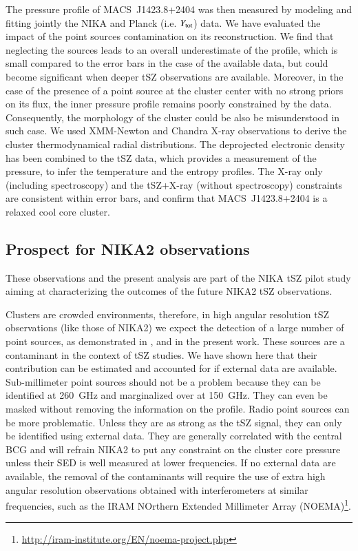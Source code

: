 \documentclass[twocolumn,traditabstract]{aa}
\begin{document}
The pressure profile of \mbox{MACS~J1423.8+2404} was then measured by modeling and fitting jointly the NIKA and Planck (i.e. $Y_{\rm tot}$) data. We have evaluated the impact of the point sources contamination on its reconstruction. We find that neglecting the sources leads to an overall underestimate of the profile, which is small compared to the error bars in the case of the available data, but could become significant when deeper tSZ observations are available. Moreover, in the case of the presence of a point source at the cluster center with no strong priors on its flux, the inner pressure profile remains poorly constrained by the data. Consequently, the morphology of the cluster could be also be misunderstood in such case. We used XMM-Newton and Chandra X-ray observations to derive the cluster thermodynamical radial distributions. The deprojected electronic density has been combined to the tSZ data, which provides a measurement of the pressure, to infer the temperature and the entropy profiles. The X-ray only (including spectroscopy) and the tSZ+X-ray (without spectroscopy) constraints are consistent within error bars, and confirm that \mbox{MACS~J1423.8+2404} is a relaxed cool core cluster.

\subsection{Prospect for NIKA2 observations}
These observations and the present analysis are part of the NIKA tSZ pilot study aiming at characterizing the outcomes of the future NIKA2 tSZ observations.

Clusters are crowded environments, therefore, in high angular resolution tSZ observations (like those of NIKA2) we expect the detection of a large number of point sources, as demonstrated in \cite{adam2013}, \cite{adam2014} and in the present work. These sources are a contaminant in the context of tSZ studies. We have shown here that their contribution can be estimated and accounted for if external data are available. Sub-millimeter point sources should not be a problem because they can be identified at 260~GHz and marginalized over at 150~GHz. They can even be masked without removing the information on the profile. Radio point sources can be more problematic. Unless they are as strong as the tSZ signal, they can only be identified using external data. They are generally correlated with the central BCG and will refrain NIKA2 to put any constraint on the cluster core pressure unless their SED is well measured at lower frequencies. If no external data are available, the removal of the contaminants will require the use of extra high angular resolution observations obtained with interferometers at similar frequencies, such as the IRAM NOrthern Extended Millimeter Array (NOEMA)\footnote{\url{http://iram-institute.org/EN/noema-project.php}}. 
\end{document}
